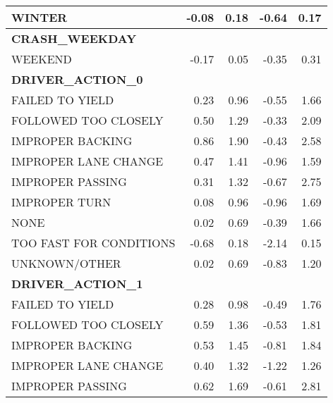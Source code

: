 \begin{tabular}{lrrrr}
WINTER &            -0.08 &             0.18 &             -0.64 &             0.17 \\
\midrule
\multicolumn{5}{l}{\textbf{CRASH\_WEEKDAY}}\\\addlinespace
WEEKEND &            -0.17 &             0.05 &             -0.35 &             0.31 \\
\midrule
\multicolumn{5}{l}{\textbf{DRIVER\_ACTION\_0}}\\\addlinespace
FAILED TO YIELD         &             0.23 &             0.96 &             -0.55 &             1.66 \\
FOLLOWED TOO CLOSELY    &             0.50 &             1.29 &             -0.33 &             2.09 \\
IMPROPER BACKING        &             0.86 &             1.90 &             -0.43 &             2.58 \\
IMPROPER LANE CHANGE    &             0.47 &             1.41 &             -0.96 &             1.59 \\
IMPROPER PASSING        &             0.31 &             1.32 &             -0.67 &             2.75 \\
IMPROPER TURN           &             0.08 &             0.96 &             -0.96 &             1.69 \\
NONE                    &             0.02 &             0.69 &             -0.39 &             1.66 \\
TOO FAST FOR CONDITIONS &            -0.68 &             0.18 &             -2.14 &             0.15 \\
UNKNOWN/OTHER           &             0.02 &             0.69 &             -0.83 &             1.20 \\
\midrule
\multicolumn{5}{l}{\textbf{DRIVER\_ACTION\_1}}\\\addlinespace
FAILED TO YIELD         &             0.28 &             0.98 &             -0.49 &             1.76 \\
FOLLOWED TOO CLOSELY    &             0.59 &             1.36 &             -0.53 &             1.81 \\
IMPROPER BACKING        &             0.53 &             1.45 &             -0.81 &             1.84 \\
IMPROPER LANE CHANGE    &             0.40 &             1.32 &             -1.22 &             1.26 \\
IMPROPER PASSING        &             0.62 &             1.69 &             -0.61 &             2.81 \\

\end{tabular}

